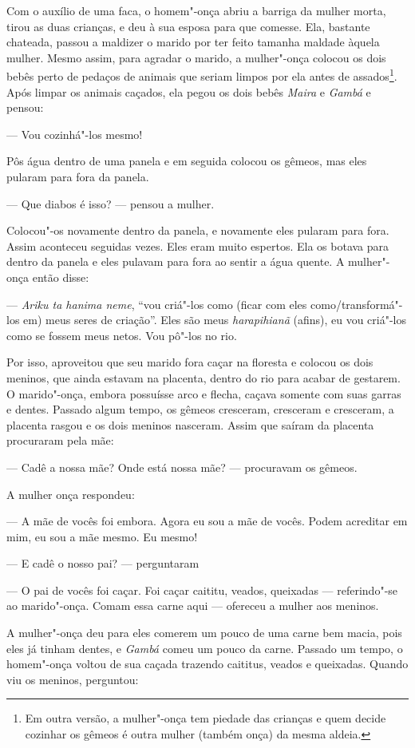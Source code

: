 \forceindent Com o auxílio de uma faca, o homem"-onça abriu a barriga da mulher morta,
tirou as duas crianças, e deu à sua esposa para que comesse. Ela,
bastante chateada, passou a maldizer o marido por ter feito tamanha
maldade àquela mulher. Mesmo assim, para agradar o marido, a mulher"-onça
colocou os dois bebês perto de pedaços de animais que seriam limpos por
ela antes de assados\footnote{Em outra versão, a mulher"-onça tem piedade
  das crianças e quem decide cozinhar os gêmeos é outra mulher (também
  onça) da mesma aldeia.}. Após limpar os animais caçados, ela pegou os
dois bebês \emph{Maira} e \emph{Gambá} e pensou:

--- Vou cozinhá"-los mesmo!

Pôs água dentro de uma panela e em seguida colocou os gêmeos, mas eles
pularam para fora da panela.

--- Que diabos é isso? --- pensou a mulher.

Colocou"-os novamente dentro da panela, e novamente eles pularam para
fora. Assim aconteceu seguidas vezes. Eles eram muito espertos. Ela os
botava para dentro da panela e eles pulavam para fora ao sentir a água
quente. A mulher"-onça então disse:

--- \emph{Ariku ta hanima neme}, ``vou criá"-los como (ficar com eles
como/transformá"-los em) meus seres de criação''. Eles são meus
\emph{harapihianã} (afins), eu vou criá"-los como se fossem meus netos.
Vou pô"-los no rio.

Por isso, aproveitou que seu marido fora caçar na floresta e colocou os
dois meninos, que ainda estavam na placenta, dentro do rio para acabar
de gestarem. O marido"-onça, embora possuísse arco e flecha, caçava
somente com suas garras e dentes. Passado algum tempo, os gêmeos
cresceram, cresceram e cresceram, a placenta rasgou e os dois meninos
nasceram. Assim que saíram da placenta procuraram pela mãe:

--- Cadê a nossa mãe? Onde está nossa mãe? --- procuravam os gêmeos.

A mulher onça respondeu:

--- A mãe de vocês foi embora. Agora eu sou a mãe de vocês. Podem
acreditar em mim, eu sou a mãe mesmo. Eu mesmo!

--- E cadê o nosso pai? --- perguntaram

--- O pai de vocês foi caçar. Foi caçar caititu, veados, queixadas ---
referindo"-se ao marido"-onça. Comam essa carne aqui --- ofereceu a mulher
aos meninos.

A mulher"-onça deu para eles comerem um pouco de uma carne bem macia,
pois eles já tinham dentes, e \emph{Gambá} comeu um pouco da carne.
Passado um tempo, o homem"-onça voltou de sua caçada trazendo caititus,
veados e queixadas. Quando viu os meninos, perguntou:

